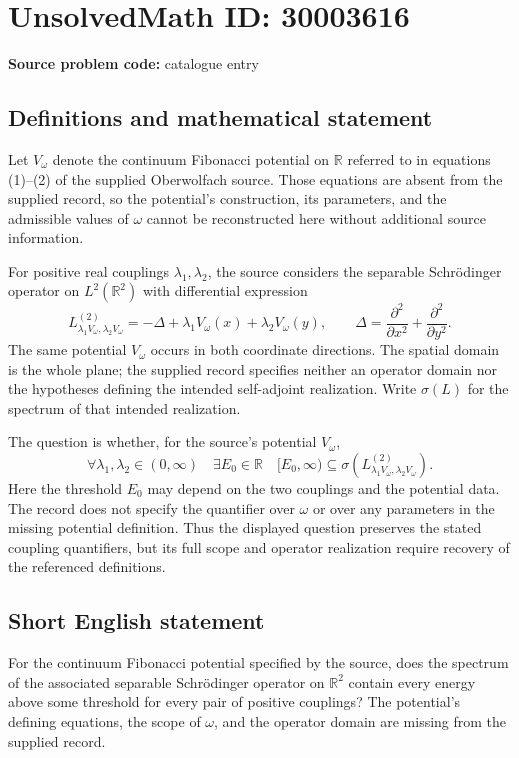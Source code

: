 \documentclass[11pt]{article}
\newcommand{\R}{\mathbb{R}}
\begin{document}
\section*{UnsolvedMath ID: 30003616}
\textbf{Source problem code:} catalogue entry
\subsection{Definitions and mathematical statement}
Let \(V_\omega\) denote the continuum Fibonacci potential on \(\R\) referred to in equations (1)--(2) of the supplied Oberwolfach source. Those equations are absent from the supplied record, so the potential's construction, its parameters, and the admissible values of \(\omega\) cannot be reconstructed here without additional source information.

For positive real couplings \(\lambda_1,\lambda_2\), the source considers the separable Schrödinger operator on \(L^2(\R^2)\) with differential expression
\[
L^{(2)}_{\lambda_1V_\omega,\lambda_2V_\omega}
=-\Delta+\lambda_1V_\omega(x)+\lambda_2V_\omega(y),
\qquad
\Delta=\frac{\partial^2}{\partial x^2}+\frac{\partial^2}{\partial y^2}.
\]
The same potential \(V_\omega\) occurs in both coordinate directions. The spatial domain is the whole plane; the supplied record specifies neither an operator domain nor the hypotheses defining the intended self-adjoint realization. Write \(\sigma(L)\) for the spectrum of that intended realization.

The question is whether, for the source's potential \(V_\omega\),
\[
\forall\lambda_1,\lambda_2\in(0,\infty)\quad
\exists E_0\in\R\quad
[E_0,\infty)\subseteq
\sigma\!\left(L^{(2)}_{\lambda_1V_\omega,\lambda_2V_\omega}\right).
\]
Here the threshold \(E_0\) may depend on the two couplings and the potential data. The record does not specify the quantifier over \(\omega\) or over any parameters in the missing potential definition. Thus the displayed question preserves the stated coupling quantifiers, but its full scope and operator realization require recovery of the referenced definitions.
\subsection{Short English statement}
For the continuum Fibonacci potential specified by the source, does the spectrum of the associated separable Schrödinger operator on \(\R^2\) contain every energy above some threshold for every pair of positive couplings? The potential's defining equations, the scope of \(\omega\), and the operator domain are missing from the supplied record.
\end{document}
